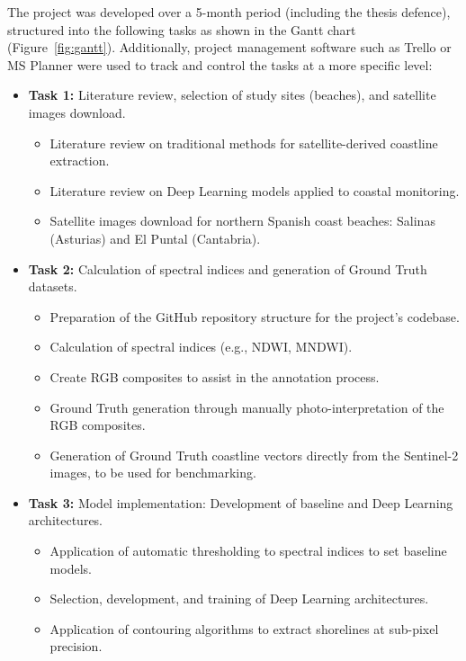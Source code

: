 ﻿\documentclass[ENG]{TFUOC}%
\begin{document}
The project was developed over a 5-month period (including the thesis defence), structured into the following tasks as shown in the Gantt chart (Figure~\ref{fig:gantt}). Additionally, project management software such as Trello or MS Planner were used to track and control the tasks at a more specific level:
\begin{itemize}
    \item \textbf{Task 1:} Literature review, selection of study sites (beaches), and satellite images download.
    \begin{itemize}
        \item Literature review on traditional methods for satellite-derived coastline extraction.
        \item Literature review on Deep Learning models applied to coastal monitoring.
        \item Satellite images download for northern Spanish coast beaches: Salinas (Asturias) and El Puntal (Cantabria).
    \end{itemize}
    \item \textbf{Task 2:} Calculation of spectral indices and generation of Ground Truth datasets.
    \begin{itemize}
        \item Preparation of the GitHub repository structure for the project's codebase.
        \item Calculation of spectral indices (e.g., NDWI, MNDWI).
        \item Create RGB composites to assist in the annotation process.
        \item Ground Truth generation through manually photo-interpretation of the RGB composites.
        \item Generation of Ground Truth coastline vectors directly from the Sentinel-2 images, to be used for benchmarking.
    \end{itemize}
    \item \textbf{Task 3:} Model implementation: Development of baseline and Deep Learning architectures.
    \begin{itemize}
        \item Application of automatic thresholding to spectral indices to set baseline models.
        \item Selection, development, and training of Deep Learning architectures.
        \item Application of contouring algorithms to extract shorelines at sub-pixel precision.
    \end{itemize}

\end{itemize}
\end{document}

